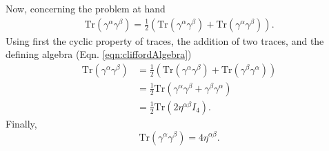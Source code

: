 Now, concerning the problem at hand
\begin{align*}
\text{Tr}(\gamma^\alpha \gamma^\beta)=\frac{1}{2}(\text{Tr}(\gamma^\alpha
\gamma^\beta)+\text{Tr}(\gamma^\alpha
\gamma^\beta)).
\end{align*}
Using first the cyclic property of traces, the addition of two traces, and the
defining algebra
(Eqn. \ref{eqn:cliffordAlgebra})
\begin{align*}
\text{Tr}(\gamma^\alpha
\gamma^\beta)&=\frac{1}{2}(\text{Tr}(\gamma^\alpha\gamma^\beta)+\text{Tr}(\gamma^\beta\gamma^\alpha))\\
&=\frac{1}{2}\text{Tr}(\gamma^\alpha\gamma^\beta+\gamma^\beta\gamma^\alpha)\\
&=\frac{1}{2}\text{Tr}(2\eta^{\alpha\beta}I_4).
\end{align*}
Finally,
\begin{equation}\label{eqn:griffithsRule12}
\text{Tr}(\gamma^\alpha\gamma^\beta)=4\eta^{\alpha\beta}.
\end{equation}



